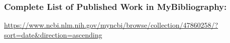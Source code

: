 \documentclass{nihbiosketch}
\begin{document}
\begin{enumerate}


\end{enumerate}

\subsubsection*{Complete List of Published Work in MyBibliography:}
\url{https://www.ncbi.nlm.nih.gov/myncbi/browse/collection/47860258/?sort=date&direction=ascending}


\end{document}
